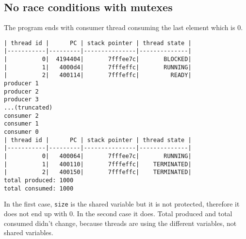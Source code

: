\documentclass[a4paper]{article}
\begin{document}
\subsection*{No race conditions with mutexes}
\label{sec:org255bcba}

The program ends with consumer thread consuming the last element which is 0.

\begin{verbatim}
| thread id |      PC | stack pointer | thread state |
|-----------|---------|---------------|--------------|
|          0|  4194404|       7fffee7c|       BLOCKED|
|          1|   4000d4|       7fffeffc|       RUNNING|
|          2|   400114|       7fffeffc|         READY|
producer 1
producer 2
producer 3
...(truncated)
consumer 2
consumer 1
consumer 0
| thread id |      PC | stack pointer | thread state |
|-----------|---------|---------------|--------------|
|          0|   400064|       7fffee7c|       RUNNING|
|          1|   400110|       7fffeffc|    TERMINATED|
|          2|   400150|       7fffeffc|    TERMINATED|
total produced: 1000
total consumed: 1000
\end{verbatim}


 In the first case, \texttt{size} is the shared variable but it is not protected, therefore it does not end up with 0. In the second case it does.
Total produced and total consumed didn't change, because threads are using the different variables, not shared variables.
\end{document}
